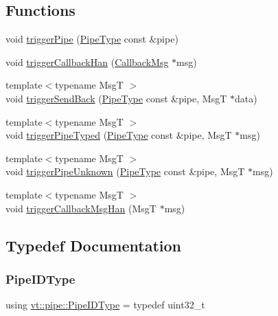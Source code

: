 \subsection*{Functions}
\begin{DoxyCompactItemize}
\item 
void \hyperlink{namespacevt_1_1pipe_ac55cd91c8aee610ae0e8b1843229a285}{trigger\+Pipe} (\hyperlink{namespacevt_ac9852acda74d1896f48f406cd72c7bd3}{Pipe\+Type} const \&pipe)
\item 
void \hyperlink{namespacevt_1_1pipe_af259c91e50470478594f47b11a8ecb88}{trigger\+Callback\+Han} (\hyperlink{structvt_1_1pipe_1_1_callback_msg}{Callback\+Msg} $\ast$msg)
\item 
{\footnotesize template$<$typename MsgT $>$ }\\void \hyperlink{namespacevt_1_1pipe_aa17c7b2572558dd48295d039f6f26c75}{trigger\+Send\+Back} (\hyperlink{namespacevt_ac9852acda74d1896f48f406cd72c7bd3}{Pipe\+Type} const \&pipe, MsgT $\ast$data)
\item 
{\footnotesize template$<$typename MsgT $>$ }\\void \hyperlink{namespacevt_1_1pipe_a1fea0e249e8f363c86cff32d9034238e}{trigger\+Pipe\+Typed} (\hyperlink{namespacevt_ac9852acda74d1896f48f406cd72c7bd3}{Pipe\+Type} const \&pipe, MsgT $\ast$msg)
\item 
{\footnotesize template$<$typename MsgT $>$ }\\void \hyperlink{namespacevt_1_1pipe_ae131e6afcc435107fcd51771caa9abc9}{trigger\+Pipe\+Unknown} (\hyperlink{namespacevt_ac9852acda74d1896f48f406cd72c7bd3}{Pipe\+Type} const \&pipe, MsgT $\ast$msg)
\item 
{\footnotesize template$<$typename MsgT $>$ }\\void \hyperlink{namespacevt_1_1pipe_a8be489288c5586b4a4d0daad173bc357}{trigger\+Callback\+Msg\+Han} (MsgT $\ast$msg)
\end{DoxyCompactItemize}


\subsection{Typedef Documentation}
\mbox{\label{namespacevt_1_1pipe_a8aa7908de242917ac0922b9e9c85fea4}} 
\subsubsection{\texorpdfstring{Pipe\+I\+D\+Type}{PipeIDType}}
{\footnotesize\ttfamily using \hyperlink{namespacevt_1_1pipe_a8aa7908de242917ac0922b9e9c85fea4}{vt\+::pipe\+::\+Pipe\+I\+D\+Type} = typedef uint32\+\_\+t}

